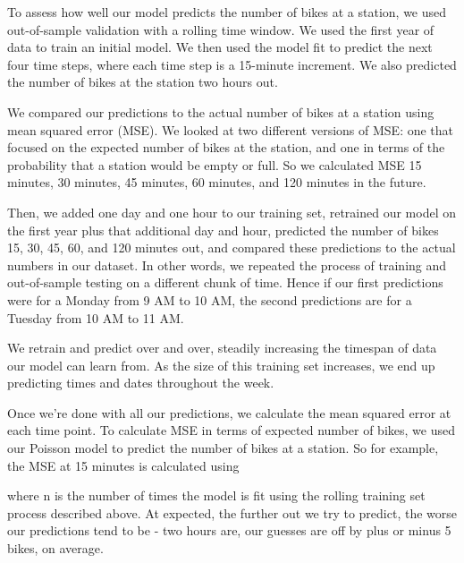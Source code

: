 \documentclass{acm_proc_article-sp}
\begin{document}
To assess how well our model predicts the number of bikes at a station, we used out-of-sample validation with a rolling time window. We used the first year of data to train an initial model. We then used the model fit to predict the next four time steps, where each time step is a 15-minute increment. We also predicted the number of bikes at the station two hours out.

We compared our predictions to the actual number of bikes at a station using mean squared error (MSE). We looked at two different versions of MSE: one that focused on the expected number of bikes at the station, and one in terms of the probability that a station would be empty or full. So we calculated MSE 15 minutes, 30 minutes, 45 minutes, 60 minutes, and 120 minutes in the future.

Then, we added one day and one hour to our training set, retrained our model on the first year plus that additional day and hour, predicted the number of bikes 15, 30, 45, 60, and 120 minutes out, and compared these predictions to the actual numbers in our dataset. In other words, we repeated the process of training and out-of-sample testing on a different chunk of time. Hence if our first predictions were for a Monday from 9 AM to 10 AM, the second predictions are for a Tuesday from 10 AM to 11 AM.

We retrain and predict over and over, steadily increasing the timespan of data our model can learn from. As the size of this training set increases, we end up predicting times and dates throughout the week.

Once we're done with all our predictions, we calculate the mean squared error at each time point. To calculate MSE in terms of expected number of bikes, we used our Poisson model to predict the number of bikes at a station. So for example, the MSE at 15 minutes is calculated using



where n is the number of times the model is fit using the rolling training set process described above. At expected, the further out we try to predict, the worse our predictions tend to be - two hours are, our guesses are off by plus or minus 5 bikes, on average.
\end{document}

